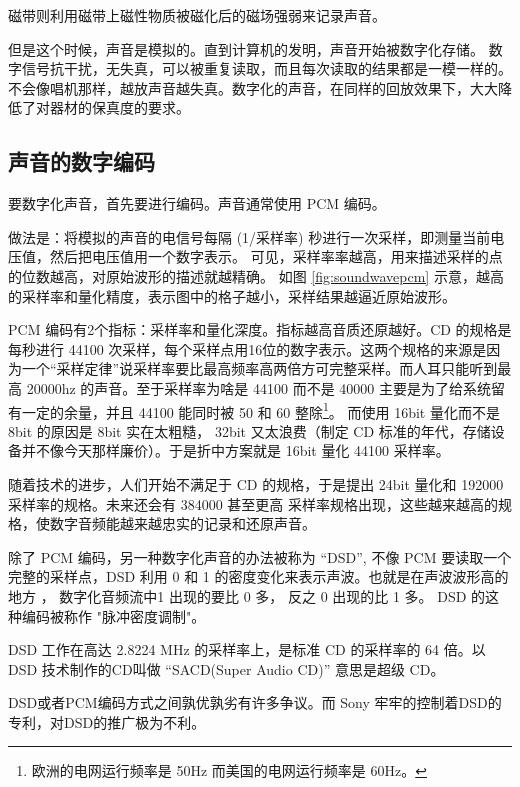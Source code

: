 磁带则利用磁带上磁性物质被磁化后的磁场强弱来记录声音。


但是这个时候，声音是模拟的。直到计算机的发明，声音开始被数字化存储。
数字信号抗干扰，无失真，可以被重复读取，而且每次读取的结果都是一模一样的。
不会像唱机那样，越放声音越失真。数字化的声音，在同样的回放效果下，大大降低了对器材的保真度的要求。

\subsection{声音的数字编码}

要数字化声音，首先要进行编码。声音通常使用 PCM 编码。

做法是：将模拟的声音的电信号每隔 (1/采样率) 秒进行一次采样，即测量当前电压值，然后把电压值用一个数字表示。
可见，采样率率越高，用来描述采样的点的位数越高，对原始波形的描述就越精确。
如图 \ref{fig:soundwavepcm} 示意，越高的采样率和量化精度，表示图中的格子越小，采样结果越逼近原始波形。


PCM 编码有2个指标：采样率和量化深度。指标越高音质还原越好。CD 的规格是每秒进行 44100 次采样，每个采样点用16位的数字表示。这两个规格的来源是因为一个“采样定律”说采样率要比最高频率高两倍方可完整采样。而人耳只能听到最高 20000hz 的声音。至于采样率为啥是  44100 而不是  40000 主要是为了给系统留有一定的余量，并且 44100 能同时被 50 和 60 整除\footnote{欧洲的电网运行频率是 50Hz 而美国的电网运行频率是 60Hz。}。 而使用 16bit 量化而不是 8bit 的原因是 8bit 实在太粗糙， 32bit 又太浪费（制定 CD 标准的年代，存储设备并不像今天那样廉价）。于是折中方案就是 16bit 量化 44100 采样率。

随着技术的进步，人们开始不满足于 CD 的规格，于是提出 24bit 量化和 192000 采样率的规格。未来还会有 384000 甚至更高 采样率规格出现，这些越来越高的规格，使数字音频能越来越忠实的记录和还原声音。

除了 PCM 编码，另一种数字化声音的办法被称为 “DSD”, 不像 PCM 要读取一个完整的采样点，DSD 利用 0 和 1 的密度变化来表示声波。也就是在声波波形高的地方 ， 数字化音频流中1 出现的要比 0 多， 反之 0 出现的比 1 多。 DSD 的这种编码被称作 "脉冲密度调制"。

DSD 工作在高达 2.8224 MHz 的采样率上，是标准 CD 的采样率的 64 倍。以 DSD 技术制作的CD叫做 “SACD(Super Audio CD)” 意思是超级 CD。

DSD或者PCM编码方式之间孰优孰劣有许多争议。而 Sony 牢牢的控制着DSD的专利，对DSD的推广极为不利。

